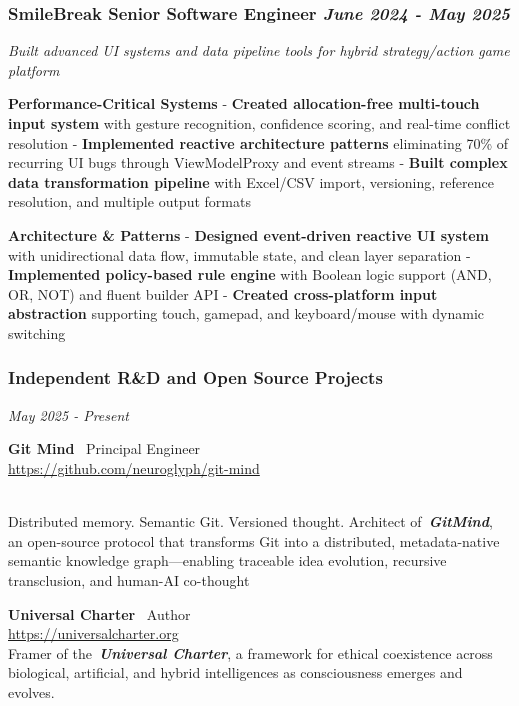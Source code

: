 \documentclass[
]{article}
\begin{document}
\subsubsection{\texorpdfstring{\textbf{SmileBreak} \textbar{} Senior
Software Engineer \textbar{} \emph{June 2024 - May
2025}}{SmileBreak \textbar{} Senior Software Engineer \textbar{} June 2024 - May 2025}}\label{smilebreak-senior-software-engineer-june-2024---may-2025}

\emph{Built advanced UI systems and data pipeline tools for hybrid
strategy/action game platform}

\textbf{Performance-Critical Systems} - \textbf{Created allocation-free
multi-touch input system} with gesture recognition, confidence scoring,
and real-time conflict resolution - \textbf{Implemented reactive
architecture patterns} eliminating 70\% of recurring UI bugs through
ViewModelProxy and event streams - \textbf{Built complex data
transformation pipeline} with Excel/CSV import, versioning, reference
resolution, and multiple output formats

\textbf{Architecture \& Patterns} - \textbf{Designed event-driven
reactive UI system} with unidirectional data flow, immutable state, and
clean layer separation - \textbf{Implemented policy-based rule engine}
with Boolean logic support (AND, OR, NOT) and fluent builder API -
\textbf{Created cross-platform input abstraction} supporting touch,
gamepad, and keyboard/mouse with dynamic switching

\subsubsection{Independent R\&D and Open Source
Projects}\label{independent-rd-and-open-source-projects}

\emph{May 2025 - Present}

\textbf{Git Mind}~\textbar{} Principal Engineer\\
\url{https://github.com/neuroglyph/git-mind}\strut \\
Distributed memory. Semantic Git. Versioned thought. Architect
of~\textbf{\emph{GitMind}}, an open-source protocol that transforms Git
into a distributed, metadata-native semantic knowledge graph---enabling
traceable idea evolution, recursive transclusion, and human-AI
co-thought

\textbf{Universal Charter}~\textbar{} Author\\
\href{https://universalcharter.org/}{https://universalcharter.org}\\
Framer of the~\textbf{\emph{Universal Charter}}, a framework for ethical
coexistence across biological, artificial, and hybrid intelligences as
consciousness emerges and evolves.
\end{document}
